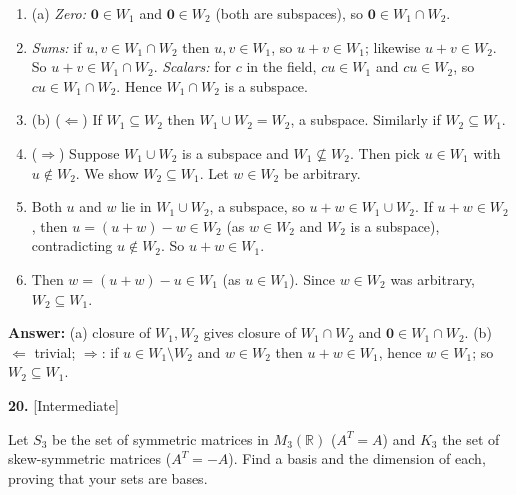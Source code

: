 \documentclass[11pt]{article}
\begin{document}
\begin{tcolorbox}[breakable,colback=ans,colframe=ansb,boxrule=0.5pt,left=4pt,right=4pt,top=2pt,bottom=2pt]\begin{enumerate}[leftmargin=3.1em,itemsep=1pt,topsep=1pt,label=\textbf{Step \arabic*.}]\item (a) \emph{Zero:} $\mathbf 0\in W_1$ and $\mathbf 0\in W_2$ (both are subspaces), so $\mathbf 0\in W_1\cap W_2$.
\item \emph{Sums:} if $u,v\in W_1\cap W_2$ then $u,v\in W_1$, so $u+v\in W_1$; likewise $u+v\in W_2$. So $u+v\in W_1\cap W_2$. \emph{Scalars:} for $c$ in the field, $cu\in W_1$ and $cu\in W_2$, so $cu\in W_1\cap W_2$. Hence $W_1\cap W_2$ is a subspace.
\item (b) ($\Leftarrow$) If $W_1\subseteq W_2$ then $W_1\cup W_2=W_2$, a subspace. Similarly if $W_2\subseteq W_1$.
\item ($\Rightarrow$) Suppose $W_1\cup W_2$ is a subspace and $W_1\not\subseteq W_2$. Then pick $u\in W_1$ with $u\notin W_2$. We show $W_2\subseteq W_1$. Let $w\in W_2$ be arbitrary.
\item Both $u$ and $w$ lie in $W_1\cup W_2$, a subspace, so $u+w\in W_1\cup W_2$. If $u+w\in W_2$, then $u=(u+w)-w\in W_2$ (as $w\in W_2$ and $W_2$ is a subspace), contradicting $u\notin W_2$. So $u+w\in W_1$.
\item Then $w=(u+w)-u\in W_1$ (as $u\in W_1$). Since $w\in W_2$ was arbitrary, $W_2\subseteq W_1$.
\end{enumerate}\textbf{Answer:} (a) closure of $W_1,W_2$ gives closure of $W_1\cap W_2$ and $\mathbf 0\in W_1\cap W_2$. (b) $\Leftarrow$ trivial; $\Rightarrow$: if $u\in W_1\setminus W_2$ and $w\in W_2$ then $u+w\in W_1$, hence $w\in W_1$; so $W_2\subseteq W_1$.\end{tcolorbox}
\par\vspace{2pt}
\begin{minipage}{\linewidth}\textbf{20.} \hfill{\scriptsize\color{ink}[Intermediate]}\par\nopagebreak Let $S_3$ be the set of symmetric matrices in $M_3(\mathbb{R})$ ($A^{T}=A$) and $K_3$ the set of skew-symmetric matrices ($A^{T}=-A$). Find a basis and the dimension of each, proving that your sets are bases.
\end{minipage}\par\nopagebreak
\end{document}
